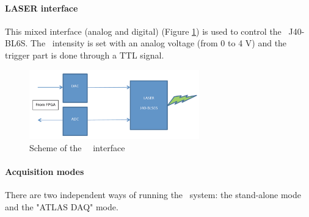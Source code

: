 \paragraph{LASER interface}

This mixed interface (analog and digital) (Figure \ref{fig:laslaserint}) is used to control the \laser~J40-BL6S. The \laser~intensity is set with an analog voltage (from 0 to 4 V) and the trigger part is done through a TTL signal.

\begin{figure}[htbp]

\centering
\includegraphics[height=3cm]{figures/laser_interface.pdf}
\caption{Scheme of the \lascar~\las~interface}\label{fig:laslaserint}
\end{figure}

\paragraph{Acquisition modes}

There are two independent ways of running the \laser~system: the stand-alone mode and the "ATLAS DAQ" mode.

